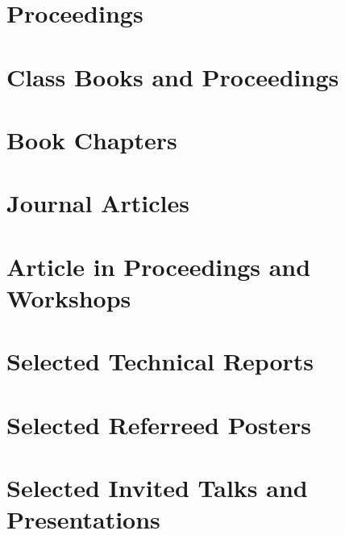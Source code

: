 \documentclass{article}
\begin{document}
\section{Proceedings}


\section{Class Books and Proceedings}

\section{Book Chapters}

\section{Journal Articles}

\section{Article in Proceedings and Workshops}

\section{Selected Technical Reports}

\section{Selected Referreed Posters}


\section{Selected Invited Talks and Presentations} 
\end{document}
